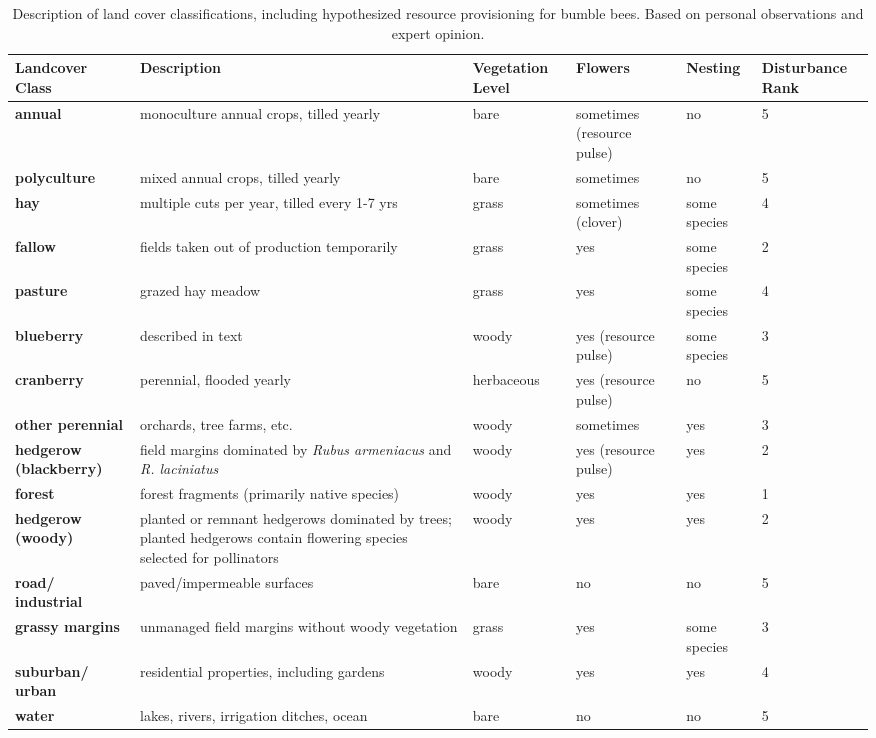 \documentclass[12pt]{article}
\begin{document}
\begin{table}
\centering
\caption{Description of land cover classifications, including hypothesized resource provisioning for bumble bees. Based on personal observations and expert opinion.}
\label{tab:landscapetable}
\footnotesize
\begin{tabular}{ p{2cm}  p{3.5cm} p{2cm} p{2.5cm} p{2cm} p{1.5cm}}
\hline
\textbf{Landcover Class}& \textbf{Description}& \textbf{Vegetation Level}& \textbf{Flowers}& \textbf{Nesting}& \textbf{Disturbance Rank}\\
\hline
\textbf{annual} & monoculture annual crops, tilled yearly& bare & sometimes (resource pulse)& no& 5 \\
\hline
\textbf{polyculture} & mixed annual crops, tilled yearly& bare & sometimes& no& 5 \\
\hline
\textbf{hay} & multiple cuts per year, tilled every 1-7 yrs& grass & sometimes (clover)& some species& 4\\
\hline
\textbf{fallow} & fields taken out of production temporarily& grass & yes& some species& 2 \\
\hline
\textbf{pasture} & grazed hay meadow& grass & yes& some species& 4\\
\hline
\textbf{blueberry} & described in text& woody & yes (resource pulse)& some species& 3 \\
   \hline       
\textbf{cranberry} & perennial, flooded yearly& herbaceous& yes (resource pulse)& no& 5 \\
\hline
\textbf{other perennial}& orchards, tree farms, etc.& woody & sometimes& yes& 3\\
\hline
\textbf{hedgerow (blackberry)}& field margins dominated by \textit{Rubus armeniacus} and \textit{R. laciniatus} & woody & yes (resource pulse)& yes& 2 \\
\hline
\textbf{forest} & forest fragments (primarily native species)& woody & yes& yes& 1 \\
\hline
\textbf{hedgerow (woody)}& planted or remnant hedgerows dominated by trees; planted hedgerows contain flowering species selected for pollinators& woody & yes& yes& 2 \\
\hline
\textbf{road/ industrial}& paved/impermeable surfaces& bare & no& no& 5 \\
\hline
\textbf{grassy margins}& unmanaged field margins without woody vegetation& grass & yes& some species& 3\\
\hline
\textbf{suburban/ urban}& residential properties, including gardens& woody & yes& yes& 4\\
\hline
\textbf{water} & lakes, rivers, irrigation ditches, ocean& bare & no& no& 5\\
\end{tabular}
\end{table}
\end{document}
